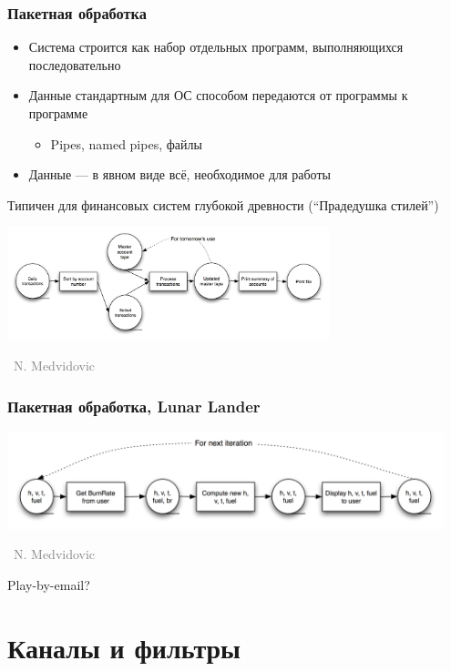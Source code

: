 \documentclass[xetex,mathserif,serif]{beamer}
\newcommand{\attribution}[1] {
	\vspace{-5mm}\begin{flushright}\begin{scriptsize}\textcolor{gray}{\textcopyright\, #1}\end{scriptsize}\end{flushright}
}
\begin{document}
	\begin{frame}
		\frametitle{Пакетная обработка}
		\begin{itemize}
			\item Система строится как набор отдельных программ, выполняющихся последовательно
			\item Данные стандартным для ОС способом передаются от программы к программе
			\begin{itemize}
				\item Pipes, named pipes, файлы
			\end{itemize}
			\item Данные --- в явном виде всё, необходимое для работы
		\end{itemize}
		Типичен для финансовых систем глубокой древности (``Прадедушка стилей'')
		\begin{center}
			\includegraphics[width=0.7\textwidth]{batch.png}
			\attribution{N. Medvidovic}
		\end{center}
	\end{frame}

	\begin{frame}
		\frametitle{Пакетная обработка, Lunar Lander}
		\begin{center}
			\includegraphics[width=0.95\textwidth]{batchLL.png}
			\attribution{N. Medvidovic}
		\end{center}
		Play-by-email?
	\end{frame}

	\section{Каналы и фильтры}
\end{document}
